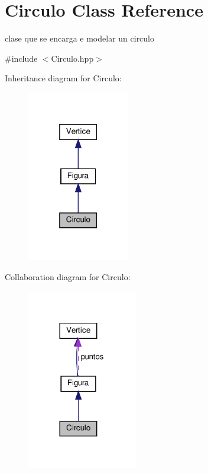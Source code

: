 \hypertarget{class_circulo}{}\section{Circulo Class Reference}
\label{class_circulo}


clase que se encarga e modelar un circulo  




{\ttfamily \#include $<$Circulo.\+hpp$>$}



Inheritance diagram for Circulo\+:
\nopagebreak
\begin{figure}[H]
\begin{center}
\leavevmode
\includegraphics[width=127pt]{class_circulo__inherit__graph}
\end{center}
\end{figure}


Collaboration diagram for Circulo\+:
\nopagebreak
\begin{figure}[H]
\begin{center}
\leavevmode
\includegraphics[width=137pt]{class_circulo__coll__graph}
\end{center}
\end{figure}
